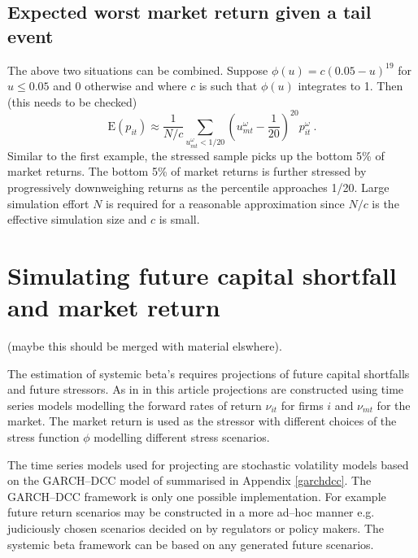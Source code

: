 \documentclass[authoryear]{elsarticle}
\newcommand{\E}{\mathrm{E}}
\renewcommand{\o}{\omega}
\newcommand{\aref}[1]{Appendix \ref{#1}}
\begin{document}
\subsection{Expected worst market return given a tail event}

The above two situations can be combined.   Suppose  $\phi(u)=c(0.05-u)^{19}$ for $u\le 0.05$ and 0 otherwise and where $c$ is such that $\phi(u)$ integrates to 1.  Then (this needs to be checked)
$$
\E(p_{it}) \approx \frac{1}{N/c}\sum_{u^\o_{mt}<1/20}  \left(u^\o_{mt}-\frac{1}{20}\right)^{20}p_{it}^\o\ .
$$
 Similar to the first example, the stressed sample picks up the bottom 5\% of market returns. The bottom 5\% of market returns is further stressed by  progressively downweighing returns as the percentile approaches 1/20.   Large simulation effort $N$ is required for a reasonable approximation since $N/c$ is the effective simulation size and $c$ is small.

\section{Simulating future capital shortfall and market return}

(maybe this should be merged with material elswhere).

The estimation of systemic beta's requires  projections of future capital shortfalls and future stressors.   As in \cite{brownlees2015} in this article projections are constructed  using time series models modelling the forward rates of return $\nu_{it}$ for firms $i$ and $\nu_{mt}$ for the market.   The market return is used as the stressor with different choices of the stress function $\phi$ modelling different stress scenarios.

The time series models used for projecting are stochastic volatility models based on the GARCH--DCC model of \cite{engle2002dynamic} summarised in \aref{garchdcc}.    The GARCH--DCC framework is only one possible implementation.   For example future return scenarios may be constructed in a more ad--hoc manner e.g. judiciously chosen scenarios decided on by regulators or policy makers.   The  systemic beta framework can be based on  any  generated  future  scenarios.
\end{document}
